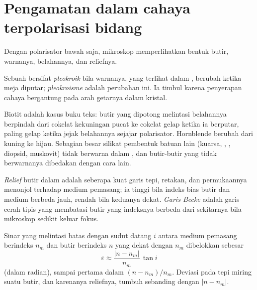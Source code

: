 \section{Pengamatan dalam cahaya terpolarisasi bidang}

Dengan polarisator bawah saja, mikroskop memperlihatkan bentuk butir, warnanya, belahannya, dan reliefnya.

\begin{definition}[Pleokroisme]\label{def:b1:optical-mineralogy:pleochroism}
Sebuah  bersifat \emph{pleokroik} bila warnanya, yang terlihat dalam , berubah ketika meja diputar; \emph{pleokroisme} adalah perubahan ini. Ia timbul karena penyerapan cahaya bergantung pada arah getarnya dalam kristal.
\end{definition}

Biotit adalah kasus buku teks: butir yang dipotong melintasi belahannya berpindah dari cokelat kekuningan pucat ke cokelat gelap ketika ia berputar, paling gelap ketika jejak belahannya sejajar polarisator. Hornblende berubah dari kuning ke hijau. Sebagian besar silikat pembentuk batuan lain (kuarsa, , , diopsid, muskovit) tidak berwarna dalam , dan butir-butir yang tidak berwarnanya dibedakan dengan cara lain.

\begin{definition}\label{def:b1:optical-mineralogy:relief}
\emph{Relief} butir dalam  adalah seberapa kuat garis tepi, retakan, dan permukaannya menonjol terhadap medium pemasang; ia tinggi bila indeks bias butir dan medium berbeda jauh, rendah bila keduanya dekat. \emph{Garis Becke} adalah garis cerah tipis yang membatasi butir yang indeksnya berbeda dari sekitarnya bila mikroskop sedikit keluar fokus.
\end{definition}

\begin{proposition}\label{prop:b1:optical-mineralogy:relief}
Sinar yang melintasi batas dengan sudut datang $i$ antara medium pemasang berindeks
$n_m$ dan butir berindeks $n$ yang dekat dengan $n_m$ dibelokkan sebesar
\[
  \varepsilon \approx \frac{|n - n_m|}{n_m}\,\tan i
\]
(dalam radian), sampai  pertama dalam $(n - n_m)/n_m$. Deviasi pada tepi miring suatu butir, dan karenanya reliefnya, tumbuh sebanding dengan $|n - n_m|$.
\end{proposition}

